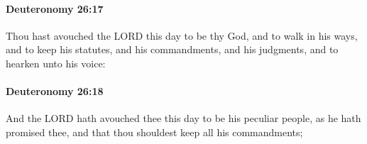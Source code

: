 		\paragraph{Deuteronomy 26:17} %
			\label{DEUTERONOMY-26-17}

			Thou hast avouched the LORD this day to be thy God, and to walk in his ways, and to keep his statutes, and his commandments, and his judgments, and to hearken unto his voice:


		\paragraph{Deuteronomy 26:18} %
			\label{DEUTERONOMY-26-18}

			And the LORD hath avouched thee this day to be his peculiar people, as he hath promised thee, and that thou shouldest keep all his commandments;


